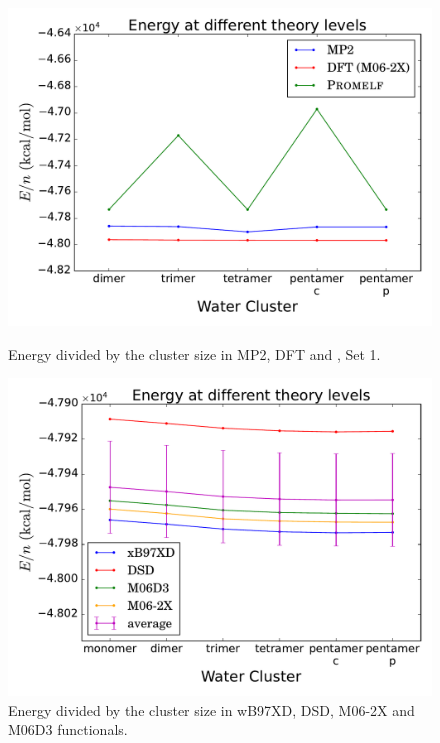 \begin{figure}[htb]
    \begin{minipage}[t]{0.48\textwidth}
      \centering
      \includegraphics[width=1.01\linewidth]{4/plots/theory_level/mp2dftpromelf.pdf}
      \caption{Energy divided by the cluster size in \gls{MP2}, DFT and {}, Set 1.}
      \label{mp2vsm062x}
    \end{minipage}%
    \hfill
    \begin{minipage}[t]{0.48\textwidth}
      \centering
      \includegraphics[width=1.01\linewidth]{4/plots/theory_level/functionals.pdf}
      \caption{Energy divided by the cluster size in wB97XD, DSD, M06-2X and M06D3 functionals.}
      \label{energies}
    \end{minipage}%
\end{figure}
